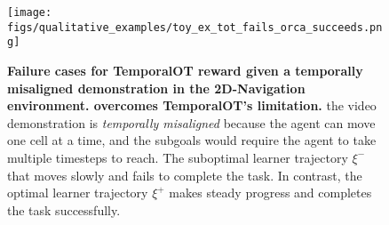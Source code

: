 \begin{figure}
    \centering
    \texttt{[image: figs/qualitative\_examples/toy\_ex\_tot\_fails\_orca\_succeeds.png]}
    \caption{\small \textbf{Failure cases for TemporalOT reward given a temporally misaligned demonstration in the 2D-Navigation environment. \orca{} overcomes TemporalOT's limitation.} the video demonstration is \emph{temporally misaligned} because the agent can move one cell at a time, and the subgoals would require the agent to take multiple timesteps to reach. The suboptimal learner trajectory $\xi^-$ that moves slowly and fails to complete the task. In contrast, the optimal learner trajectory $\xi^+$ makes steady progress and completes the task successfully.}
    \label{fig:tot_fail_full}
\end{figure}
